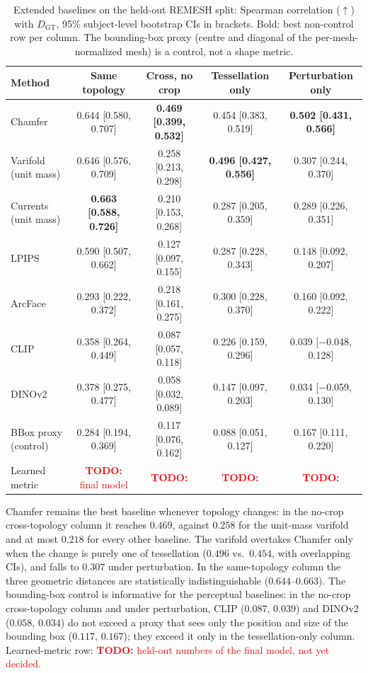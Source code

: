 \documentclass[10pt,twocolumn,letterpaper]{article}
\newcommand{\todo}[1]{\textcolor{red}{\textbf{TODO:} #1}}
\begin{document}
\begin{table}[!ht]
\centering
\footnotesize
\caption{Extended baselines on the held-out REMESH split: Spearman correlation ($\uparrow$) with $D_{\mathrm{GT}}$, 95\% subject-level bootstrap CIs in brackets. Bold: best non-control row per column. The bounding-box proxy (centre and diagonal of the per-mesh-normalized mesh) is a control, not a shape metric.}
\label{tab:extended_baselines}
\setlength{\tabcolsep}{3pt}
\begin{tabular}{lcccc}
\toprule
Method & Same topology & Cross, no crop & Tessellation only & Perturbation only \\
\midrule
Chamfer & 0.644 [0.580, 0.707] & \textbf{0.469 [0.399, 0.532]} & 0.454 [0.383, 0.519] & \textbf{0.502 [0.431, 0.566]} \\
Varifold (unit mass) & 0.646 [0.576, 0.709] & 0.258 [0.213, 0.298] & \textbf{0.496 [0.427, 0.556]} & 0.307 [0.244, 0.370] \\
Currents (unit mass) & \textbf{0.663 [0.588, 0.726]} & 0.210 [0.153, 0.268] & 0.287 [0.205, 0.359] & 0.289 [0.226, 0.351] \\
LPIPS & 0.590 [0.507, 0.662] & 0.127 [0.097, 0.155] & 0.287 [0.228, 0.343] & 0.148 [0.092, 0.207] \\
ArcFace & 0.293 [0.222, 0.372] & 0.218 [0.161, 0.275] & 0.300 [0.228, 0.370] & 0.160 [0.092, 0.222] \\
CLIP & 0.358 [0.264, 0.449] & 0.087 [0.057, 0.118] & 0.226 [0.159, 0.296] & 0.039 [$-$0.048, 0.128] \\
DINOv2 & 0.378 [0.275, 0.477] & 0.058 [0.032, 0.089] & 0.147 [0.097, 0.203] & 0.034 [$-$0.059, 0.130] \\
\midrule
BBox proxy (control) & 0.284 [0.194, 0.369] & 0.117 [0.076, 0.162] & 0.088 [0.051, 0.127] & 0.167 [0.111, 0.220] \\
Learned metric & \todo{final model} & \todo{} & \todo{} & \todo{} \\
\bottomrule
\end{tabular}
\end{table}

Chamfer remains the best baseline whenever topology changes: in the no-crop cross-topology column it reaches $0.469$, against $0.258$ for the unit-mass varifold and at most $0.218$ for every other baseline. The varifold overtakes Chamfer only when the change is purely one of tessellation ($0.496$ vs.\ $0.454$, with overlapping CIs), and falls to $0.307$ under perturbation. In the same-topology column the three geometric distances are statistically indistinguishable ($0.644$--$0.663$). The bounding-box control is informative for the perceptual baselines: in the no-crop cross-topology column and under perturbation, CLIP ($0.087$, $0.039$) and DINOv2 ($0.058$, $0.034$) do not exceed a proxy that sees only the position and size of the bounding box ($0.117$, $0.167$); they exceed it only in the tessellation-only column. Learned-metric row: \todo{held-out numbers of the final model, not yet decided}.
\end{document}
